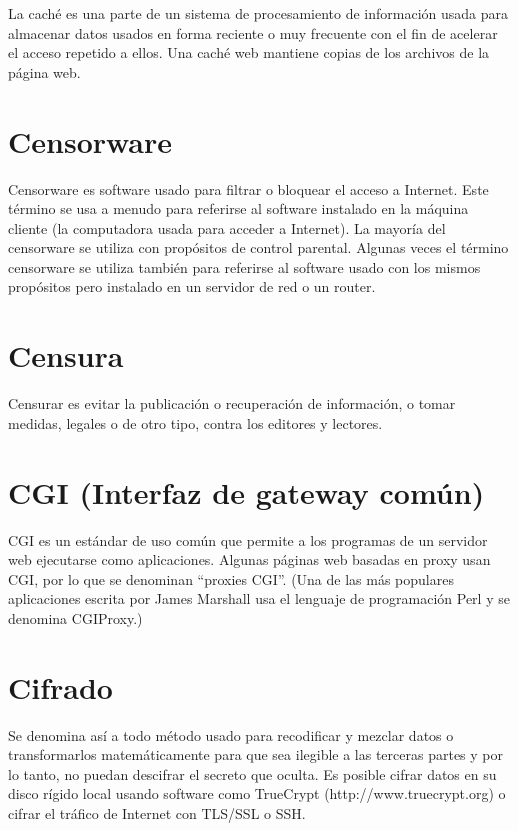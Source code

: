 \documentclass[10pt,a5paper,twoside,,]{book}
\begin{document}
La caché es una parte de un sistema de procesamiento de información
usada para almacenar datos usados en forma reciente o muy frecuente con
el fin de acelerar el acceso repetido a ellos. Una caché web mantiene
copias de los archivos de la página web.

\section{Censorware}\label{censorware}

Censorware es software usado para filtrar o bloquear el acceso a
Internet. Este término se usa a menudo para referirse al software
instalado en la máquina cliente (la computadora usada para acceder a
Internet). La mayoría del censorware se utiliza con propósitos de
control parental. Algunas veces el término censorware se utiliza también
para referirse al software usado con los mismos propósitos pero
instalado en un servidor de red o un router.

\section{Censura}\label{censura}

Censurar es evitar la publicación o recuperación de información, o tomar
medidas, legales o de otro tipo, contra los editores y lectores.

\section{CGI (Interfaz de gateway
común)}\label{cgi-interfaz-de-gateway-comuxfan}

CGI es un estándar de uso común que permite a los programas de un
servidor web ejecutarse como aplicaciones. Algunas páginas web basadas
en proxy usan CGI, por lo que se denominan ``proxies CGI''. (Una de las
más populares aplicaciones escrita por James Marshall usa el lenguaje de
programación Perl y se denomina CGIProxy.)

\section{Cifrado}\label{cifrado}

Se denomina así a todo método usado para recodificar y mezclar datos o
transformarlos matemáticamente para que sea ilegible a las terceras
partes y por lo tanto, no puedan descifrar el secreto que oculta. Es
posible cifrar datos en su disco rígido local usando software como
TrueCrypt (http://www.truecrypt.org) o cifrar el tráfico de Internet con
TLS/SSL o SSH.
\end{document}
